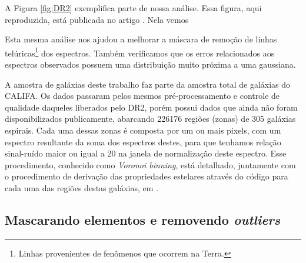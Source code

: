 A Figura \ref{fig:DR2} exemplifica parte de nossa análise. Essa figura, aqui reproduzida, está publicada no artigo \citet{GarciaBenito.etal.2015a}. Nela vemos

Esta mesma análise nos ajudou a melhorar a máscara de remoção de linhas telúricas\footnote{Linhas provenientes de fenômenos que ocorrem na Terra.} dos espectros. Também verificamos que os erros relacionados aos espectros observados possuem uma distribuição muito próxima a uma gaussiana.

A amostra de galáxias deste trabalho faz parte da amostra total de galáxias do CALIFA. Os dados passaram pelos mesmos pré-processamento e controle de qualidade daqueles liberados pelo DR2, porém possui dados que ainda não foram disponibilizados publicamente, abarcando 226176 regiões (zonas) de 305 galáxias espirais. Cada uma dessas zonas é composta por um ou mais pixels, com um espectro resultante da soma dos espectros destes, para que tenhamos relação sinal-ruído maior ou igual a 20 na janela de normalização deste espectro. Esse procedimento, conhecido como {\em Voronoi binning}, está detalhado, juntamente com o procedimento de derivação das propriedades estelares através do código \starlight para cada uma das regiões destas galáxias, em \citet{CidFernandes.etal.2013a}.

\subsection{Mascarando elementos e removendo {\em outliers}}
\label{sec:sample:mask}

